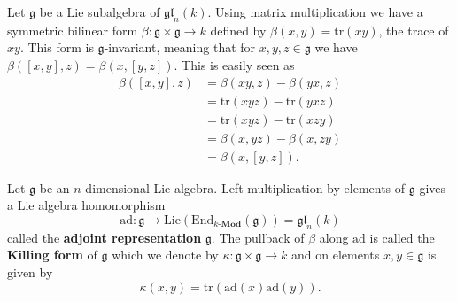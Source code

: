 Let $ \mathfrak{g} $ be a Lie subalgebra of $ \mathfrak{gl}_n(k) $. Using matrix multiplication we have a symmetric bilinear form $ \beta: \mathfrak{g} \times \mathfrak{g} \to k $ defined by $ \beta(x, y)=\mathrm{tr}(xy) $, the trace of $ xy $. This form is $ \mathfrak{g} $-invariant, meaning that for $ x,y,z \in \mathfrak{g} $ we have $ \beta([x,y],z)=\beta(x, [y,z]) $. This is easily seen as
\begin{align*}
  \beta([x,y],z) &= \beta(xy, z) - \beta(yx, z) \\
                 &= \mathrm{tr}(xyz) - \mathrm{tr}(yxz) \\
                 &= \mathrm{tr}(xyz) - \mathrm{tr}(xzy) \\
                 &= \beta(x, yz) - \beta(x, zy) \\
                 &= \beta(x, [y, z])
.\end{align*}
\begin{definition}
  Let $ \mathfrak{g} $ be an $ n $-dimensional Lie algebra. Left multiplication by elements of $ \mathfrak{g} $ gives a Lie algebra homomorphism
  \begin{equation}
    \mathrm{ad}: \mathfrak{g} \to \text{Lie}(\text{End}_{k\text{-}\mathbf{Mod}}(\mathfrak{g})) = \mathfrak{gl}_{n}(k)
    \label{eq:adjoint}
  \end{equation}
  called the \textbf{adjoint representation} $ \mathfrak{g} $. The pullback of $ \beta $ along $ \mathrm{ad} $ is called the \textbf{Killing form} of $ \mathfrak{g} $ which we denote by $ \kappa: \mathfrak{g} \times \mathfrak{g} \to k $ and on elements $ x, y \in \mathfrak{g} $ is given by
  \begin{equation}
    \kappa(x, y) = \mathrm{tr}(\mathrm{ad}(x)\mathrm{ad}(y)).
    \label{eq:kappa}
  \end{equation}
\end{definition}

